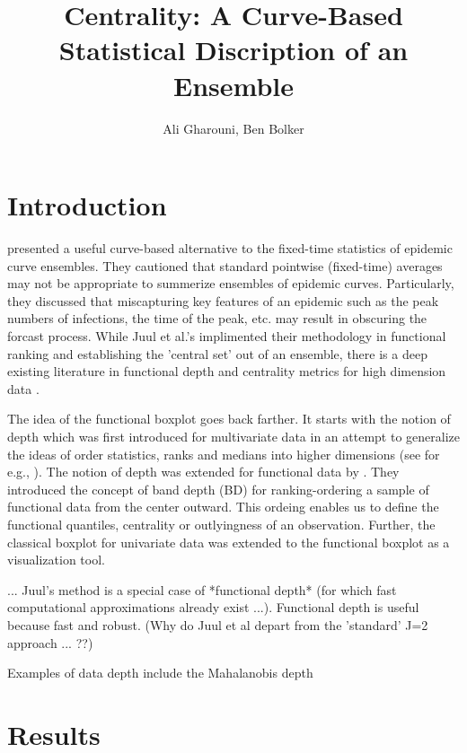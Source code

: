 \documentclass[12pt]{article}
\title{Centrality: A Curve-Based Statistical Discription of an Ensemble}
\author{Ali Gharouni, Ben Bolker}
\theoremstyle{definition} %
\begin{document}
\maketitle
\linenumbers

\section{Introduction}

\cite{juul2021fixed} presented a useful curve-based alternative to the fixed-time statistics of epidemic curve ensembles. 
They cautioned that standard pointwise (fixed-time) averages may not be appropriate to summerize ensembles of epidemic curves. Particularly, they discussed that miscapturing key features of an epidemic such as the peak numbers of infections, the time of the peak, etc. may result in obscuring the forcast process.
While Juul et al.'s implimented their methodology in functional ranking and establishing the 'central set' out of an ensemble, there is a deep existing literature in functional depth and centrality metrics for high dimension data \citep{lopez2009concept,sun2011functional,sun2012exact}. 

The idea of the functional boxplot goes back farther.
It starts with the notion of depth which was first introduced for multivariate data in an attempt to generalize the ideas of order statistics, ranks and medians into higher dimensions (see for e.g., \cite{mahalanobis1936generalized,tukey1975mathematics}).
The notion of depth was extended for functional data by \citep{lopez2009concept}. They introduced the concept of band depth (BD) for ranking-ordering  a sample of functional data from the center outward. This ordeing enables us to define the functional quantiles, centrality or outlyingness of an observation. Further, the classical boxplot for univariate data was extended to the functional boxplot as a visualization tool.

... Juul's method is a special case of *functional depth* (for which fast computational approximations already exist ...). Functional depth is useful because fast and robust. (Why do Juul et al depart from the 'standard' J=2 approach ... ??)

Examples of data depth include the Mahalanobis depth \citep{mahalanobis1936generalized}
\section{Results}
\end{document}
